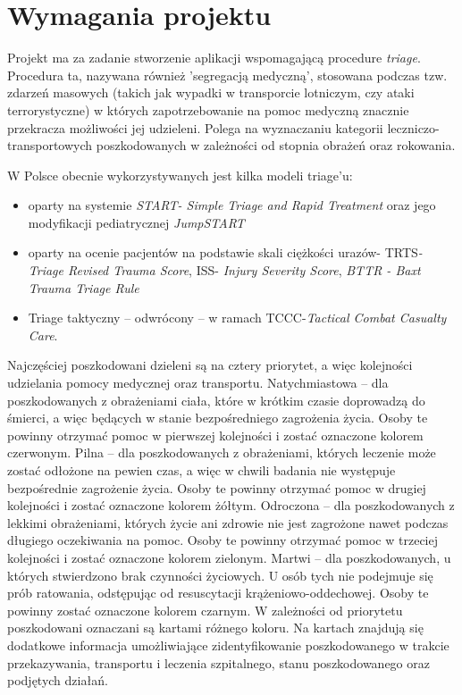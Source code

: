 \documentclass[11pt]{report}
\begin{document}

\tableofcontents
\newpage
\section{Wymagania projektu}
Projekt ma za zadanie stworzenie aplikacji wspomagającą procedure \textit{triage}. Procedura ta, nazywana również 'segregacją medyczną', stosowana podczas tzw. zdarzeń masowych (takich jak wypadki w transporcie lotniczym, czy ataki terrorystyczne) w których zapotrzebowanie na pomoc medyczną znacznie przekracza możliwości jej udzieleni. Polega na wyznaczaniu kategorii leczniczo-transportowych poszkodowanych w zależności od stopnia obrażeń oraz rokowania. 

\noindent
W Polsce obecnie wykorzystywanych jest kilka modeli triage'u:
\begin{itemize}
    \item{
        oparty na systemie  \textit{START- Simple Triage and Rapid Treatment} oraz jego modyfikacji pediatrycznej \textit{JumpSTART}
    }
    \item{
        oparty na ocenie pacjentów na podstawie skali ciężkości urazów-  \textsc{TRTS}\textit{- Triage Revised Trauma Score}, \textsc{ISS}- \textit{Injury Severity Score}, \textit{BTTR - Baxt Trauma Triage Rule}
    }
    \item {
        Triage taktyczny – odwrócony – w ramach \textsc{TCCC}-\textit{Tactical Combat Casualty Care}.
    }
\end{itemize}
Najczęściej poszkodowani dzieleni są na cztery priorytet, a więc kolejności udzielania pomocy medycznej oraz transportu. Natychmiastowa – dla poszkodowanych z obrażeniami ciała, które w krótkim czasie doprowadzą do śmierci, a więc będących w stanie bezpośredniego zagrożenia życia. Osoby te powinny otrzymać pomoc w pierwszej kolejności i zostać oznaczone kolorem czerwonym. Pilna – dla poszkodowanych z obrażeniami, których leczenie może zostać odłożone na pewien czas, a więc w chwili badania nie występuje bezpośrednie zagrożenie życia. Osoby te powinny otrzymać pomoc w drugiej kolejności i zostać oznaczone kolorem żółtym. Odroczona – dla poszkodowanych z lekkimi obrażeniami, których życie ani zdrowie nie jest zagrożone nawet podczas długiego oczekiwania na pomoc. Osoby te powinny otrzymać pomoc w trzeciej kolejności i zostać oznaczone kolorem zielonym. Martwi – dla poszkodowanych, u których stwierdzono brak czynności życiowych. U osób tych nie podejmuje się prób ratowania, odstępując od resuscytacji krążeniowo-oddechowej. Osoby te powinny zostać oznaczone kolorem czarnym. W zależności od priorytetu poszkodowani oznaczani są kartami różnego koloru. Na kartach znajdują się dodatkowe informacja umożliwiające zidentyfikowanie poszkodowanego w trakcie przekazywania, transportu i leczenia szpitalnego, stanu poszkodowanego oraz podjętych działań.
\end{document}
